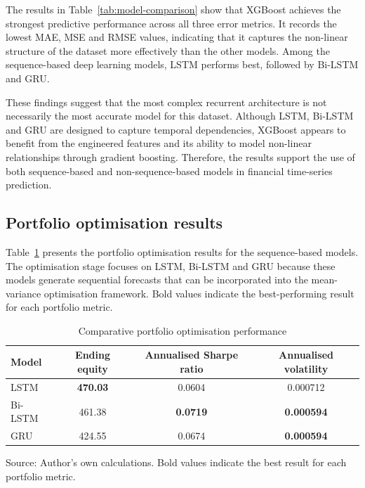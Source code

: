 The results in Table~\ref{tab:model-comparison} show that XGBoost achieves the strongest predictive performance across all three error metrics. It records the lowest MAE, MSE and RMSE values, indicating that it captures the non-linear structure of the dataset more effectively than the other models. Among the sequence-based deep learning models, LSTM performs best, followed by Bi-LSTM and GRU.

These findings suggest that the most complex recurrent architecture is not necessarily the most accurate model for this dataset. Although LSTM, Bi-LSTM and GRU are designed to capture temporal dependencies, XGBoost appears to benefit from the engineered features and its ability to model non-linear relationships through gradient boosting. Therefore, the results support the use of both sequence-based and non-sequence-based models in financial time-series prediction.

\subsection{Portfolio optimisation results}

Table~\ref{tab:portfolio-comparison} presents the portfolio optimisation results for the sequence-based models. The optimisation stage focuses on LSTM, Bi-LSTM and GRU because these models generate sequential forecasts that can be incorporated into the mean-variance optimisation framework. Bold values indicate the best-performing result for each portfolio metric.

\begin{table}[htbp]
\centering
\caption{Comparative portfolio optimisation performance}
\label{tab:portfolio-comparison}
\begin{tabular}{lccc}
\toprule
\textbf{Model} & \textbf{Ending equity} & \textbf{Annualised Sharpe ratio} & \textbf{Annualised volatility} \\
\midrule
LSTM    & \textbf{470.03} & 0.0604 & 0.000712 \\
Bi-LSTM & 461.38 & \textbf{0.0719} & \textbf{0.000594} \\
GRU     & 424.55 & 0.0674 & \textbf{0.000594} \\
\bottomrule
\end{tabular}

\vspace{0.2cm}
\footnotesize Source: Author's own calculations. Bold values indicate the best result for each portfolio metric.
\end{table}

